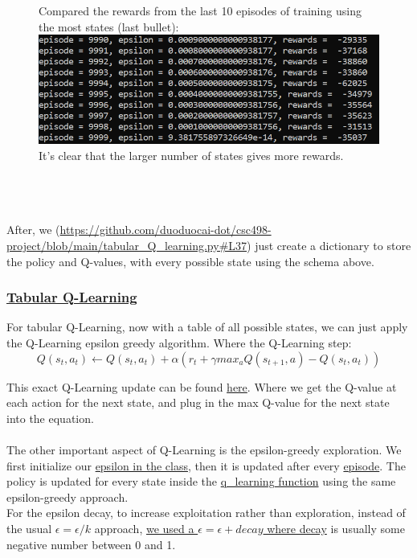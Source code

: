 \documentclass[twoside,11pt]{article}
\begin{document}
\begin{figure}[h]
Compared the rewards from the last 10 episodes of training using the most states (last bullet):\\
\includegraphics[scale=0.5]{rewards_last_10_episodes_largest_number_states}
\centering
\\ It's clear that the larger number of states gives more rewards.
\end{figure}
\\\\\\
After, we (\url{https://github.com/duoduocai-dot/csc498-project/blob/main/tabular_Q_learning.py#L37}) just create a dictionary to store the policy and Q-values, with every possible state using the schema above.

\subsubsection{\href{https://github.com/duoduocai-dot/csc498-project/blob/main/tabular_Q_learning.py}{Tabular Q-Learning}}
For tabular Q-Learning, now with a table of all possible states, we can just apply the Q-Learning epsilon greedy algorithm. Where the Q-Learning step:
\begin{equation}
Q(s_t,a_t) \leftarrow Q(s_t,a_t) + \alpha (r_t + \gamma max_a Q(s_{t+1},a) - Q(s_t,a_t))
\end{equation}

This exact Q-Learning update can be found \href{https://github.com/duoduocai-dot/csc498-project/blob/main/tabular_Q_learning.py#L88}{here}. Where we get the Q-value at each action for the next state, and plug in the max Q-value for the next state into the equation.
\\\\
The other important aspect of Q-Learning is the epsilon-greedy exploration. We first initialize our \href{https://github.com/duoduocai-dot/csc498-project/blob/main/tabular_Q_learning.py#L54}{epsilon in the class}, then it is updated after every \href{https://github.com/duoduocai-dot/csc498-project/blob/main/tabular_Q_learning.py#L285}{episode}. The policy is updated for every state inside the \href{https://github.com/duoduocai-dot/csc498-project/blob/main/tabular_Q_learning.py#L103}{q\_learning function} using the same epsilon-greedy approach. 
\\
For the epsilon decay, to increase exploitation rather than exploration, instead of the usual $\epsilon = \epsilon/k$ approach, \href{https://github.com/duoduocai-dot/csc498-project/blob/main/tabular_Q_learning.py#L285}{we used a $\epsilon = \epsilon + decay$ where decay} is usually some negative number between 0 and 1.
\end{document}

